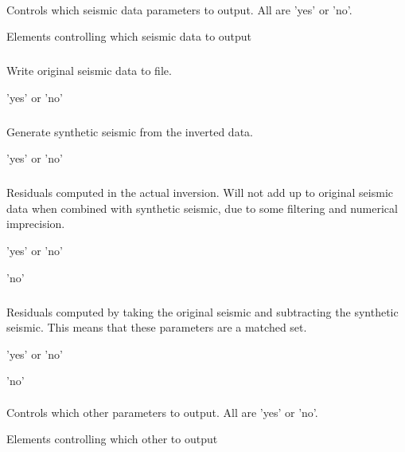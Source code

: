 \paragraph{}
 \slist
   \item \Description Controls which seismic data parameters to output. All are 'yes' or 'no'.
   \item \Argument Elements controlling which seismic data to output
   \item \Default
 \elist
\subparagraph{}
 \slist
   \item \Description Write original seismic data to file.
   \item \Argument 'yes' or 'no'
   \item \Default
 \elist

\subparagraph{}
 \slist
   \item \Description Generate synthetic seismic from the inverted data.
   \item \Argument 'yes' or 'no'
   \item \Default
 \elist

\subparagraph{}
 \slist
   \item \Description Residuals computed in the actual inversion. Will not add up to original seismic data when combined with synthetic seismic, due to some filtering and numerical imprecision.
   \item \Argument 'yes' or 'no'
   \item \Default 'no'
\elist

\subparagraph{}
 \slist
   \item \Description Residuals computed by taking the original seismic and subtracting the synthetic seismic. This means that these parameters are a matched set.
   \item \Argument 'yes' or 'no'
   \item \Default 'no'
\elist

\paragraph{}
 \slist
   \item \Description Controls which other parameters to output. All are 'yes' or 'no'.
   \item \Argument Elements controlling which other to output
   \item \Default
 \elist

